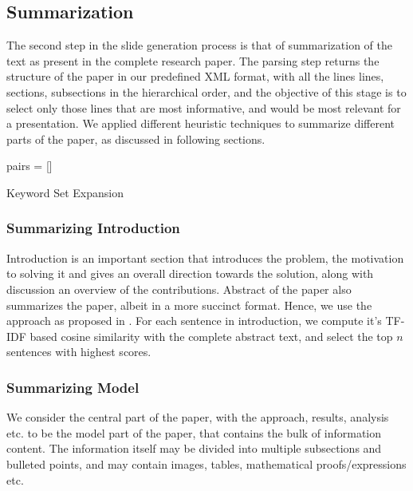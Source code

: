 \subsection{Summarization}

The second step in the slide generation process is that of summarization of the text
as present in the complete research paper. The parsing step returns the structure of
the paper in our predefined XML format, with all the lines lines, sections, subsections
in the hierarchical order, and the objective of this stage is to select only those lines
that are most informative, and would be most relevant for a presentation. We applied 
different heuristic techniques to summarize different parts of the paper, as discussed
in following sections.

\begin{algorithm}[H]\label{algo_set_expand}
 \SetLine %
 pairs = []\\
 \caption{Keyword Set Expansion}
\end{algorithm}


\subsubsection{Summarizing Introduction}
Introduction is an important section that introduces the problem, the motivation to solving it
and gives an overall direction towards the solution, along with discussion an overview of
the contributions. Abstract of the paper also summarizes the paper, albeit in a more succinct 
format. Hence, we use the approach as proposed in \cite{sravanthi}. For each sentence 
in introduction, we compute it's TF-IDF based cosine similarity with the complete abstract
text, and select the top $n$ sentences with highest scores.

\subsubsection{Summarizing Model}
We consider the central part of the paper, with the approach, results, analysis etc.
to be the model part of the paper, that contains the bulk of information content.
The information itself may be divided into multiple subsections and bulleted points,
and may contain images, tables, mathematical proofs/expressions etc.



